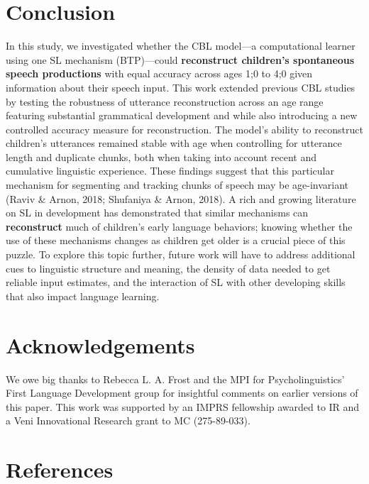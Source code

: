 \documentclass[
  english,
  man,mask,floatsintext]{apa6}
\begin{document}
\hypertarget{conclusion}{%
\section{Conclusion}\label{conclusion}}

In this study, we investigated whether the CBL model---a computational learner using one SL mechanism (BTP)---could \textbf{reconstruct children's spontaneous speech productions} with equal accuracy across ages 1;0 to 4;0 given information about their speech input. This work extended previous CBL studies by testing the robustness of utterance reconstruction across an age range featuring substantial grammatical development and while also introducing a new controlled accuracy measure for reconstruction. The model's ability to reconstruct children's utterances remained stable with age when controlling for utterance length and duplicate chunks, both when taking into account recent and cumulative linguistic experience. These findings suggest that this particular mechanism for segmenting and tracking chunks of speech may be age-invariant (Raviv \& Arnon, 2018; Shufaniya \& Arnon, 2018). A rich and growing literature on SL in development has demonstrated that similar mechanisms can \textbf{reconstruct} much of children's early language behaviors; knowing whether the use of these mechanisms changes as children get older is a crucial piece of this puzzle. To explore this topic further, future work will have to address additional cues to linguistic structure and meaning, the density of data needed to get reliable input estimates, and the interaction of SL with other developing skills that also impact language learning.

\hypertarget{acknowledgements}{%
\section{Acknowledgements}\label{acknowledgements}}

We owe big thanks to Rebecca L. A. Frost and the MPI for Psycholinguistics' First Language Development group for insightful comments on earlier versions of this paper. This work was supported by an IMPRS fellowship awarded to IR and a Veni Innovational Research grant to MC (275-89-033).

\newpage

\hypertarget{references}{%
\section{References}\label{references}}
\end{document}
